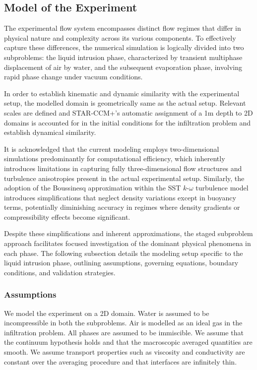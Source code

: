 \subsection{Model of the Experiment}
The experimental flow system encompasses distinct flow regimes that 
differ in physical nature and complexity across its various components. 
To effectively capture these differences, the numerical simulation is 
logically divided into two subproblems: the liquid intrusion phase, 
characterized by transient multiphase displacement of air by water, and 
the subsequent evaporation phase, involving rapid phase change under vacuum 
conditions.

In order to establish kinematic and dynamic similarity with the experimental 
setup, the modelled domain is geometrically same as the actual setup.
Relevant scales are defined and STAR-CCM+'s automatic assignment
of a 1m depth to 2D domains is accounted for in the initial conditions 
for the infiltration problem and establish dynamical similarity. 

It is acknowledged that the current modeling employs two-dimensional 
simulations predominantly for computational efficiency, which inherently 
introduces limitations in capturing fully three-dimensional flow structures 
and turbulence anisotropies present in the actual experimental setup. 
Similarly, the adoption of the Boussinesq approximation within the SST 
$k$-$\omega$ turbulence model introduces simplifications that neglect density 
variations except in buoyancy terms, potentially diminishing accuracy 
in regimes where density gradients or compressibility effects become significant.

Despite these simplifications and inherent approximations, the staged 
subproblem approach facilitates focused investigation of the dominant 
physical phenomena in each phase. The following subsection details 
the modeling setup specific to the liquid intrusion phase, outlining 
assumptions, governing equations, boundary conditions, and validation strategies.

\subsubsection{Assumptions}
We model the experiment on a 2D domain. Water is assumed to be 
incompressible in both the subproblems. Air is modelled as an 
ideal gas in the infiltration problem. All phases are assumed to be immiscible.
We assume that the continuum hypothesis holds and that the macroscopic 
averaged quantities are smooth. 
We assume transport properties such as viscosity and conductivity are constant 
over the averaging procedure and that interfaces are infinitely 
thin. 

